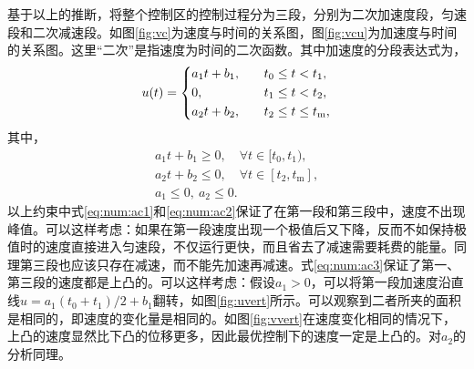 基于以上的推断，将整个控制区的控制过程分为三段，分别为二次加速度段，匀速段和二次减速段。如图\ref{fig:vc}为速度与时间的关系图，图\ref{fig:vcu}为加速度与时间的关系图。这里“二次”是指速度为时间的二次函数。其中加速度的分段表达式为，
\begin{equation}
u(t)=
\begin{dcases}
a_1t+b_1,\quad& t_0\leq t < t_1,\\
0, \quad& t_1\leq t < t_2,\\
a_2t+b_2,\quad& t_2\leq t\leq t_\mathrm{m},
\end{dcases}
\end{equation}
其中，
\begin{gather}
a_1t+b_1 \geq 0,\quad \forall t\in [t_0,t_1),\label{eq:num:ac1}\\
a_2t+b_2 \leq 0,\quad \forall t\in [t_2,t_\mathrm{m}],\label{eq:num:ac2}\\
a_1\leq 0,\ a_2\leq 0.\label{eq:num:ac3}
\end{gather}
以上约束中式\eqref{eq:num:ac1}和\eqref{eq:num:ac2}保证了在第一段和第三段中，速度不出现峰值。可以这样考虑：如果在第一段速度出现一个极值后又下降，反而不如保持极值时的速度直接进入匀速段，不仅运行更快，而且省去了减速需要耗费的能量。同理第三段也应该只存在减速，而不能先加速再减速。式\eqref{eq:num:ac3}保证了第一、第三段的速度都是上凸的。可以这样考虑：假设$a_1>0$，可以将第一段加速度沿直线$u=a_1(t_0+t_1)/2+b_1$翻转，如图\ref{fig:uvert}所示。可以观察到二者所夹的面积是相同的，即速度的变化量是相同的。如图\ref{fig:vvert}在速度变化相同的情况下，上凸的速度显然比下凸的位移更多，因此最优控制下的速度一定是上凸的。对$a_2$的分析同理。
